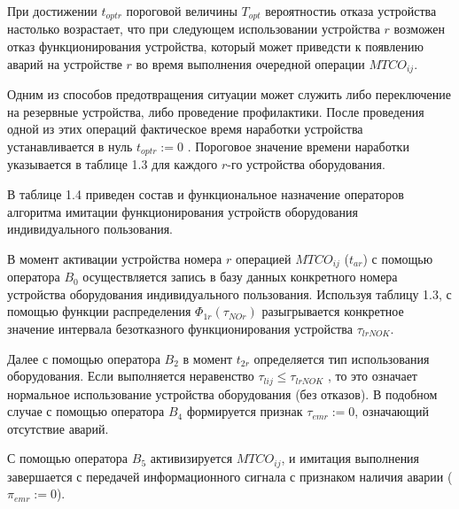 При достижении $t_{optr}$ пороговой величины $T_{opt}$ вероятностиь отказа устройства настолько возрастает, что при следующем использовании устройства $r$ возможен отказ функционирования устройства, который может приведсти к появлению аварий на устройстве $r$ во время выполнения очередной операции $MTCO_{ij}$.

Одним из способов предотвращения ситуации может служить либо переключение на резервные устройства, либо проведение профилактики. После проведения одной из этих операций фактическое время наработки устройства устанавливается в нуль $t_{optr}:=0$ . Пороговое значение времени наработки указывается в таблице 1.3 для каждого $r$-го устройства оборудования.

В таблице 1.4 приведен состав и функциональное назначение операторов алгоритма имитации функционирования устройств оборудования индивидуального пользования.

В момент активации устройства номера $r$ операцией $MTCO_{ij}$ ($t_{ar}$) с помощью оператора $B_0$ осуществляется запись в базу данных конкретного номера устройства оборудования индивидуального пользования. Используя таблицу 1.3, с помощью функции распределения $\Phi_{1r}(\tau_{NOr})$  разыгрывается конкретное значение интервала безотказного функционирования устройства $\tau_{lrNOK}$.

Далее с помощью оператора $B_2$ в момент $t_{2r}$ определяется тип использования оборудования. Если выполняется неравенство $\tau_{lij}  \leq  \tau_{lrNOK}$ , то это означает нормальное использование устройства оборудования (без отказов). В подобном случае с помощью оператора $B_4$ формируется признак $\tau_{emr}:=0$, означающий отсутствие аварий.

С помощью оператора $B_5$ активизируется $MTCO_{ij}$, и имитация выполнения завершается с передачей информационного сигнала с признаком наличия аварии  ($\pi_{emr}:=0$).

